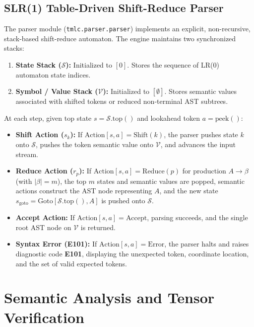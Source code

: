 \documentclass[11pt,a4paper]{article}
\begin{document}
\subsection{SLR(1) Table-Driven Shift-Reduce Parser}
The parser module (\texttt{tmlc.parser.parser}) implements an explicit, non-recursive, stack-based shift-reduce automaton. The engine maintains two synchronized stacks:
\begin{enumerate}
    \item \textbf{State Stack ($\mathcal{S}$):} Initialized to $[0]$. Stores the sequence of LR(0) automaton state indices.
    \item \textbf{Symbol / Value Stack ($\mathcal{V}$):} Initialized to $[\emptyset]$. Stores semantic values associated with shifted tokens or reduced non-terminal AST subtrees.
\end{enumerate}

At each step, given top state $s = \mathcal{S}.\text{top}()$ and lookahead token $a = \text{peek}()$:
\begin{itemize}
    \item \textbf{Shift Action ($s_k$):} If $\text{Action}[s, a] = \text{Shift}(k)$, the parser pushes state $k$ onto $\mathcal{S}$, pushes the token semantic value onto $\mathcal{V}$, and advances the input stream.
    \item \textbf{Reduce Action ($r_p$):} If $\text{Action}[s, a] = \text{Reduce}(p)$ for production $A \rightarrow \beta$ (with $|\beta| = m$), the top $m$ states and semantic values are popped, semantic actions construct the AST node representing $A$, and the new state $s_{\text{goto}} = \text{Goto}[\mathcal{S}.\text{top}(), A]$ is pushed onto $\mathcal{S}$.
    \item \textbf{Accept Action:} If $\text{Action}[s, a] = \text{Accept}$, parsing succeeds, and the single root AST node on $\mathcal{V}$ is returned.
    \item \textbf{Syntax Error (E101):} If $\text{Action}[s, a] = \text{Error}$, the parser halts and raises diagnostic code \textbf{E101}, displaying the unexpected token, coordinate location, and the set of valid expected tokens.
\end{itemize}

\section{Semantic Analysis and Tensor Verification}
\label{sec:semantic}
\end{document}
